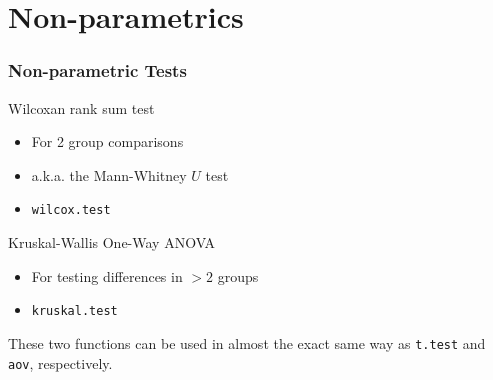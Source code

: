 \documentclass[color=usenames,dvipsnames]{beamer}\usepackage[]{graphicx}\usepackage[]{color}
\newcommand{\inr}[1]{\colorbox{inlinecolor}{\texttt{#1}}}
\begin{document}











\section{Non-parametrics}






\begin{frame}[fragile]
  \frametitle{Non-parametric Tests}
  \large
  {Wilcoxan rank sum test}
  \begin{itemize}
    \item For 2 group comparisons
    \item a.k.a. the Mann-Whitney $U$ test
    \item \inr{wilcox.test}
  \end{itemize}
  \pause
  \vspace{0.5cm}
  {Kruskal-Wallis One-Way ANOVA}
  \begin{itemize}
    \item For testing differences in $>2$ groups
    \item \inr{kruskal.test}
  \end{itemize}
\pause
\vfill
\centering
These two functions can be used in almost the exact same way as
\inr{t.test} and \inr{aov}, respectively. \\
\end{frame}
\end{document}
